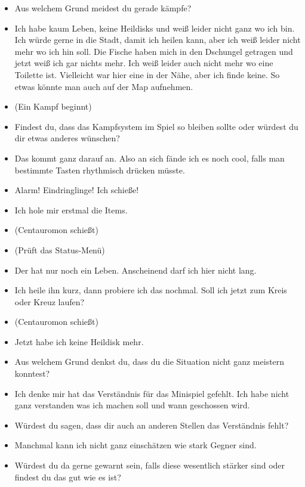 {\begin{itemize}[]
    \item {} Aus welchem Grund meidest du gerade kämpfe?
    \item {} Ich habe kaum Leben, keine Heildisks und weiß leider nicht ganz wo ich bin. Ich würde gerne in die Stadt, damit ich heilen kann, aber ich weiß leider nicht mehr wo ich hin soll. Die Fische haben mich in den Dschungel getragen und jetzt weiß ich gar nichts mehr. Ich weiß leider auch nicht mehr wo eine Toilette ist. Vielleicht war hier eine in der Nähe, aber ich finde keine. So etwas könnte man auch auf der Map aufnehmen.
    \item {} (Ein Kampf beginnt)
    \item {} Findest du, dass das Kampfsystem im Spiel so bleiben sollte oder würdest du dir etwas anderes wünschen?
    \item {} Das kommt ganz darauf an. Also an sich fände ich es noch cool, falls man bestimmte Tasten rhythmisch drücken müsste. 
    \item {} \frq  Alarm! Eindringlinge! Ich schieße!\flq{}
    \item {} Ich hole mir erstmal die Items.
    \item {} (Centauromon schießt)
    \item {} (Prüft das Status-Menü) 
    \item {} Der hat nur noch ein Leben. Anscheinend darf ich hier nicht lang.
    \item {} Ich heile ihn kurz, dann probiere ich das nochmal. Soll ich jetzt zum Kreis oder Kreuz laufen?
    \item {} (Centauromon schießt)
    \item {} Jetzt habe ich keine Heildisk mehr.
    \item {} Aus welchem Grund denkst du, dass du die Situation nicht ganz meistern konntest?
    \item {} Ich denke mir hat das Verständnis für das Minispiel gefehlt. Ich habe nicht ganz verstanden was ich machen soll und wann geschossen wird.
    \item {} Würdest du sagen, dass dir auch an anderen Stellen das Verständnis fehlt? 
    \item {} Manchmal kann ich nicht ganz einschätzen wie stark Gegner sind.
    \item {} Würdest du da gerne gewarnt sein, falls diese wesentlich stärker sind oder findest du das gut wie es ist?

\end{itemize}}
